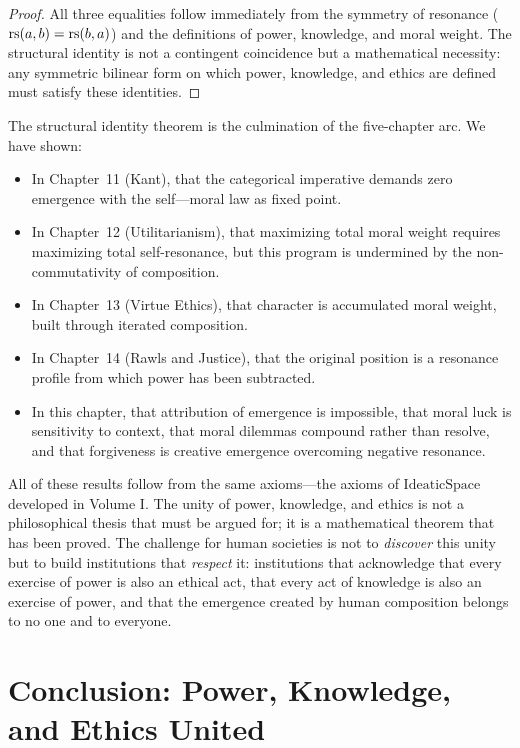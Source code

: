 \begin{proof}
All three equalities follow immediately from the symmetry of resonance
($\mathrm{rs}(a,b) = \mathrm{rs}(b,a)$) and the definitions of power, knowledge, and
moral weight. The structural identity is not a contingent coincidence but
a mathematical necessity: any symmetric bilinear form on which power,
knowledge, and ethics are defined must satisfy these identities.
\end{proof}

\begin{interpretation}
The structural identity theorem is the culmination of the five-chapter arc.
We have shown:
\begin{itemize}
\item In Chapter~11 (Kant), that the categorical imperative demands zero
emergence with the self---moral law as fixed point.
\item In Chapter~12 (Utilitarianism), that maximizing total moral weight
requires maximizing total self-resonance, but this program is undermined by
the non-commutativity of composition.
\item In Chapter~13 (Virtue Ethics), that character is accumulated moral
weight, built through iterated composition.
\item In Chapter~14 (Rawls and Justice), that the original position is a
resonance profile from which power has been subtracted.
\item In this chapter, that attribution of emergence is impossible, that
moral luck is sensitivity to context, that moral dilemmas compound rather
than resolve, and that forgiveness is creative emergence overcoming
negative resonance.
\end{itemize}

All of these results follow from the same axioms---the axioms of
$\mathrm{IdeaticSpace}$ developed in Volume I. The unity of power,
knowledge, and ethics is not a philosophical thesis that must be argued
for; it is a mathematical theorem that has been proved. The challenge
for human societies is not to \emph{discover} this unity but to build
institutions that \emph{respect} it: institutions that acknowledge that
every exercise of power is also an ethical act, that every act of
knowledge is also an exercise of power, and that the emergence created
by human composition belongs to no one and to everyone.
\end{interpretation}

\section{Conclusion: Power, Knowledge, and Ethics United}
\label{sec:ethics-conclusion}

